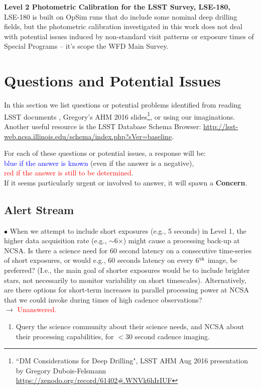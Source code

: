 \documentclass[DM,lsstdraft,toc]{lsstdoc}
\begin{document}
\noindent \textbf{Level 2 Photometric Calibration for the LSST Survey, LSE-180, \cite{LSE-180}}\\
LSE-180 is built on OpSim runs that do include some nominal deep drilling fields, but the photometric calibration investigated in this work does not deal with potential issues induced by non-standard visit patterns or exposure times of Special Programs -- it's scope the WFD Main Survey. 



\clearpage
\section{Questions and Potential Issues}\label{sec:issues}

In this section we list questions or potential problems identified from reading LSST documents \citep{LSE-163,LDM-151}, Gregory's AHM 2016 slides\footnote{``DM Considerations for Deep Drilling", LSST AHM Aug 2016 presentation by Gregory Dubois-Felsmann \url{https://zenodo.org/record/61402\#.WNVk6hIrIUF}}, or using our imaginations. Another useful resource is the LSST Database Schema Browser: \url{http://lsst-web.ncsa.illinois.edu/schema/index.php?sVer=baseline}.

For each of these questions or potential issues, a response will be: \\
\textcolor{blue}{blue if the answer is known} (even if the answer is a negative), \\
\textcolor{red}{red if the answer is still to be determined}. \\
If it seems particularly urgent or involved to answer, it will spawn a \textbf{Concern}.


\subsection{Alert Stream}\label{ssec:issues_alerts}

$\bullet$ When we attempt to include short exposures (e.g., 5 seconds) in Level 1, the higher data acquisition rate (e.g., $\sim$6$\times$) might cause a processing back-up at NCSA. Is there a science need for 60 second latency on a consecutive time-series of short exposures, or would e.g., 60 seconds latency on every 6$^{\rm th}$ image, be preferred? (I.e., the main goal of shorter exposures would be to include brighter stars, not necessarily to monitor variability on short timescales). Alternatively, are there options for short-term increases in parallel processing power at NCSA that we could invoke during times of high cadence observations? \\
$\rightarrow$ \textcolor{red}{Unanswered.}
\begin{enumerate}[resume,topsep=-10pt,label= \textbf{Concern \Roman*.}] \item \label{C7} Query the science community about their science needs, and NCSA about their processing capabilities, for $<30$ second cadence imaging. \end{enumerate}
\end{document}
